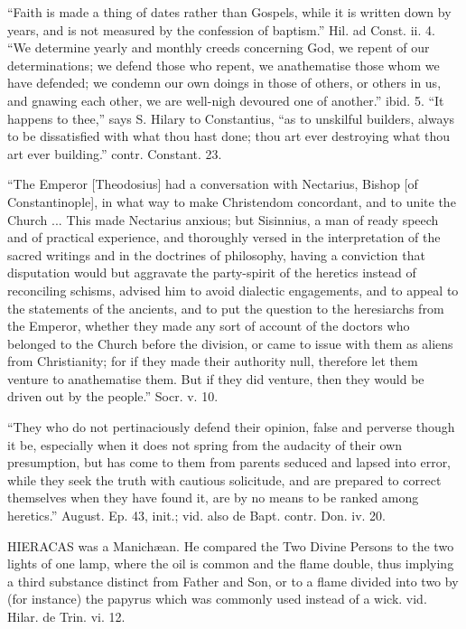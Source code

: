 ``Faith is made a thing of dates rather than
Gospels, while it is written down by years, and is not measured by the
confession of baptism.'' Hil. ad Const. ii. 4. ``We determine yearly
and monthly creeds concerning God, we repent of our determinations; we
defend those who repent, we anathematise those whom we have defended;
we condemn our own doings in those of others, or others in us, and
gnawing each other, we are well-nigh devoured one of another.'' ibid.
5. ``It happens to thee,'' says S. Hilary to Constantius, ``as to
unskilful builders, always to be dissatisfied with what thou hast
done; thou art ever destroying what thou art ever building.'' contr.
Constant. 23.

``The Emperor [Theodosius] had a conversation
with Nectarius, Bishop [of Constantinople], in what way to make
Christendom concordant, and to unite the Church ... This made
Nectarius anxious; but Sisinnius, a man of ready speech and of
practical experience, and thoroughly versed in the interpretation of
the sacred writings and in the doctrines of philosophy, having a
conviction that disputation would but aggravate the party-spirit of
the heretics instead of reconciling schisms, advised him to avoid
dialectic engagements, and to appeal to the statements of the
ancients, and to put the question to the heresiarchs from the Emperor,
whether they made any sort of account of the doctors who belonged to
the Church before the division, or came to issue with them as aliens
from Christianity; for if they made their authority null, therefore
let them venture to anathematise them. But if they did venture, then
they would be driven out by the people.'' Socr. v. 10.

``They who do not pertinaciously defend their
opinion, false and perverse though it be, especially when it does not
spring from the audacity of their own presumption, but has come to
them from parents seduced and lapsed into error, while they seek the
truth with cautious solicitude, and are prepared to correct themselves
when they have found it, are by no means to be ranked among
heretics.'' August. Ep. 43, init.; vid. also de Bapt. contr. Don. iv.
20.


HIERACAS
was a Manichæan. He compared the Two Divine Persons to the two lights
of one lamp, where the oil is common and the flame double, thus
implying a third substance distinct from Father and Son, or to a flame
divided into two by (for instance) the papyrus which was commonly used
instead of a wick. vid. Hilar. de Trin. vi. 12.

